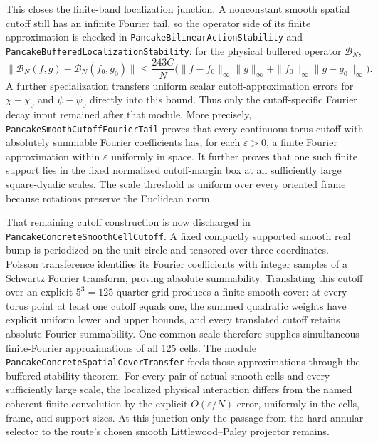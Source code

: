\documentclass[11pt]{article}
\theoremstyle{definition}
\begin{document}
This closes the finite-band localization junction.  A nonconstant smooth
spatial cutoff still has an infinite Fourier tail, so the operator side of its
finite approximation is checked in \texttt{PancakeBilinearActionStability} and
\texttt{PancakeBufferedLocalizationStability}: for the physical buffered
operator $\mathcal B_N$,
\[
 \|\mathcal B_N(f,g)-\mathcal B_N(f_0,g_0)\|
 \leq \frac{243C}{N}
 \bigl(\|f-f_0\|_\infty\|g\|_\infty
      +\|f_0\|_\infty\|g-g_0\|_\infty\bigr).
\]
A further specialization transfers uniform scalar cutoff-approximation errors
for $\chi-\chi_0$ and $\psi-\psi_0$ directly into this bound.  Thus only the
cutoff-specific Fourier decay input remained after that module.  More precisely,
\texttt{PancakeSmoothCutoffFourierTail} proves that every continuous torus
cutoff with absolutely summable Fourier coefficients has, for each
$\varepsilon>0$, a finite Fourier approximation within $\varepsilon$
uniformly in space.  It further proves that one such finite support lies in
the fixed normalized cutoff-margin box at all sufficiently large
square-dyadic scales.  The scale threshold is uniform over every oriented
frame because rotations preserve the Euclidean norm.

That remaining cutoff construction is now discharged in
\texttt{PancakeConcreteSmoothCellCutoff}.  A fixed compactly supported smooth
real bump is periodized on the unit circle and tensored over three coordinates.
Poisson transference identifies its Fourier coefficients with integer samples
of a Schwartz Fourier transform, proving absolute summability.  Translating
this cutoff over an explicit $5^3=125$ quarter-grid produces a finite smooth
cover: at every torus point at least one cutoff equals one, the summed
quadratic weights have explicit uniform lower and upper bounds, and every
translated cutoff retains absolute Fourier summability.  One common scale
therefore supplies simultaneous finite-Fourier approximations of all 125
cells.  The module \texttt{PancakeConcreteSpatialCoverTransfer} feeds those
approximations through the buffered stability theorem.  For every pair of
actual smooth cells and every sufficiently large scale, the localized
physical interaction differs from the named coherent finite convolution by
the explicit $O(\varepsilon/N)$ error, uniformly in the cells, frame, and
support sizes.  At this junction only the passage from the hard annular
selector to the route's chosen smooth Littlewood--Paley projector remains.
\end{document}
